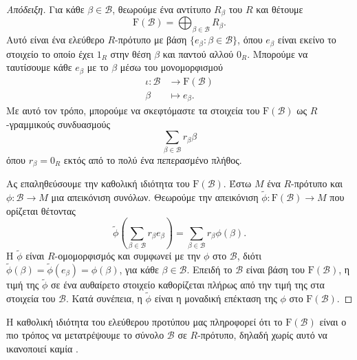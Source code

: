 \documentclass[12pt,a4paper,reqno]{amsart}
\theoremstyle{definition}
\theoremstyle{remark}
\numberwithin{theorem}{section}
\numberwithin{exercise}{section}
\numberwithin{equation}{section}
\newcommand{\bB}{\mathcal{B}}
\newcommand{\rmF}{\mathrm{F}}
\renewcommand{\to}{\rightarrow}
\begin{document}
\begin{proof}[Απόδειξη]
    Για κάθε $\beta \in \bB$, θεωρούμε ένα αντίτυπο $R_\beta$ του $R$ και θέτουμε 
    \[
    \rmF(\bB) = \bigoplus_{\beta \in \bB} R_\beta. 
    \]
    Αυτό είναι ένα ελεύθερο $R$-πρότυπο με βάση $\{e_\beta : \beta \in \bB\}$, όπου $e_\beta$ είναι εκείνο το στοιχείο το οποίο έχει $1_R$ στην θέση $\beta$ και παντού αλλού $0_R$. Μπορούμε να ταυτίσουμε κάθε $e_\beta$ με το $\beta$ μέσω του  μονομορφισμού 
    \begin{align*}
        \iota : \bB &\to \rmF(\bB) \\ 
        \beta &\mapsto e_\beta.
    \end{align*}
    Με αυτό τον τρόπο, μπορούμε να σκεφτόμαστε τα στοιχεία του $\rmF(\bB)$ ως  $R$-γραμμικούς συνδυασμούς 
    \[
    \sum_{\beta \in \bB} r_\beta \beta 
    \]
    όπου $r_\beta = 0_R$ εκτός από το πολύ ένα πεπερασμένο πλήθος.

    Ας επαληθεύσουμε την καθολική ιδιότητα του $\rmF(\bB)$. Έστω $M$ ένα $R$-πρότυπο και $\phi : \bB \to M$ μια απεικόνιση συνόλων. Θεωρούμε την απεικόνιση $\tilde{\phi} : \rmF(\bB) \to M$ που ορίζεται θέτοντας 
    \[
    \tilde{\phi}\left(
        \sum_{\beta \in \bB} r_\beta e_\beta 
    \right) = \sum_{\beta \in \bB} r_\beta \phi(\beta).
    \]
    Η $\tilde{\phi}$ είναι $R$-ομομορφισμός και συμφωνεί με την $\phi$ στο $\bB$, διότι $\tilde{\phi}(\beta) = \tilde{\phi}(e_\beta) = \phi(\beta)$, για κάθε $\beta \in \bB$. Επειδή το $\bB$ είναι βάση του $\rmF(\bB)$, η τιμή της $\tilde{\phi}$ σε ένα αυθαίρετο στοιχείο καθορίζεται πλήρως από την τιμή της στα στοιχεία του $\bB$. Κατά συνέπεια, η $\tilde{\phi}$ είναι η μοναδική επέκταση της $\phi$ στο $\rmF(\bB)$.
\end{proof}

Η καθολική ιδιότητα του ελεύθερου προτύπου μας πληροφορεί ότι το $\rmF(\bB)$ είναι ο πιο  τρόπος να μετατρέψουμε το σύνολο $\bB$ σε $R$-πρότυπο, δηλαδή χωρίς αυτό να ικανοποιεί καμία . 
\end{document}
